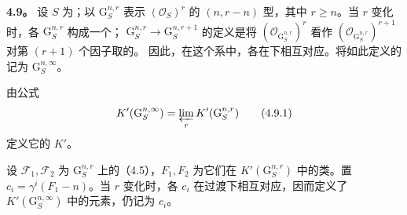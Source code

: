 \textbf{4.9。} 设 $S$ 为；以 $\mathrm G_S^{n,r}$ 表示 $(\mathcal O_S)^r$ 的 $(n,r-n)$ 型，其中 $r\geq n$。当 $r$ 变化时，各 $\mathrm G_S^{n,r}$ 构成一个； $\mathrm G_S^{n,r}\longrightarrow\mathrm G_S^{n,r+1}$ 的定义是将 $(\mathcal O_{\mathrm G_S^{n,r}})^r$ 看作 $(\mathcal O_{\mathrm G_S^{n,r}})^{r+1}$ 对第 $(r+1)$ 个因子取的。
因此，在这个系中，各在下相互对应。将如此定义的记为 $\mathrm G_S^{n,\infty}$。

由公式
\[
K'(\mathrm G_S^{n,\infty})=\varprojlim_r K'(\mathrm G_S^{n,r})
\tag{4.9.1}
\]
定义它的 $K'$。

设 $\mathcal F_1,\mathcal F_2$ 为 $\mathrm G_S^{n,r}$ 上的（4.5），$F_1,F_2$ 为它们在 $K'(\mathrm G_S^{n,r})$ 中的类。置 $c_i=\gamma^i(F_1-n)$。当 $r$ 变化时，各 $c_i$ 在过渡下相互对应，因而定义了 $K'(\mathrm G_S^{n,\infty})$ 中的元素，仍记为 $c_i$。

